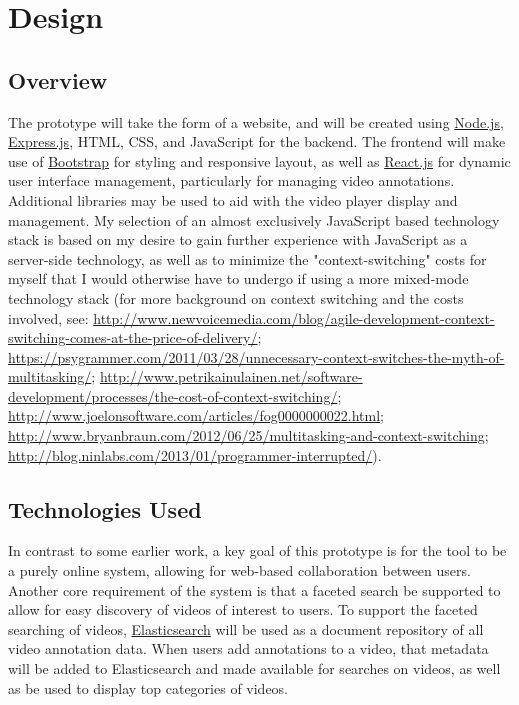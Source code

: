 %
\chapter{Design}
\label{sec:design}


\section{Overview}
\label{sec:design:overview}

The prototype will take the form of a website, and will be created using \hyperref[glossary:node.js]{Node.js}, \hyperref[glossary:express.js]{Express.js}, HTML, CSS, and JavaScript for the backend.  The frontend will make use of \hyperref[glossary:bootstrap]{Bootstrap} for styling and responsive layout, as well as \hyperref[glossary:react.js]{React.js} for dynamic user interface management, particularly for managing video annotations.  Additional libraries may be used to aid with the video player display and management.  My selection of an almost exclusively JavaScript based technology stack is based on my desire to gain further experience with JavaScript as a server-side technology, as well as to minimize the "context-switching" costs for myself that I would otherwise have to undergo if using a more mixed-mode technology stack (for more background on context switching and the costs involved, see: \url{http://www.newvoicemedia.com/blog/agile-development-context-switching-comes-at-the-price-of-delivery/}; \url{https://psygrammer.com/2011/03/28/unnecessary-context-switches-the-myth-of-multitasking/}; \url{http://www.petrikainulainen.net/software-development/processes/the-cost-of-context-switching/}; \url{http://www.joelonsoftware.com/articles/fog0000000022.html}; \url{http://www.bryanbraun.com/2012/06/25/multitasking-and-context-switching}; \url{http://blog.ninlabs.com/2013/01/programmer-interrupted/}).


\section{Technologies Used}
\label{sec:overview:technologies-used}

In contrast to some earlier work, a key goal of this prototype is for the tool to be a purely online system, allowing for web-based collaboration between users.  Another core requirement of the system is that a faceted search be supported to allow for easy discovery of videos of interest to users.  To support the faceted searching of videos, \hyperref[glossary:elasticsearch]{Elasticsearch} will be used as a document repository of all video annotation data.  When users add annotations to a video, that metadata will be added to Elasticsearch and made available for searches on videos, as well as be used to display top categories of videos.

